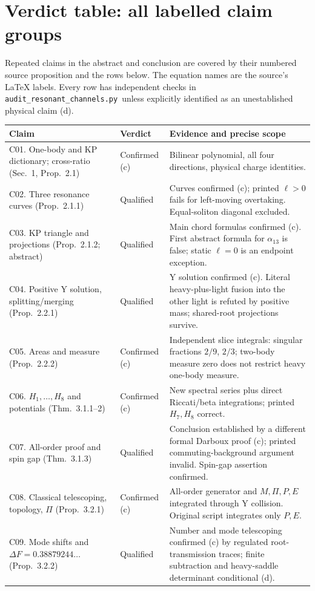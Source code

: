 \documentclass[11pt,a4paper]{article}
\newcommand{\scr}{\texttt{audit\_\allowbreak resonant\_\allowbreak channels.py}}
\begin{document}
\section{Verdict table: all labelled claim groups}
Repeated claims in the abstract and conclusion are covered by their numbered
source proposition and the rows below. The equation names are the source's
LaTeX labels. Every row has independent checks in \scr\ unless explicitly
identified as an unestablished physical claim (d).
\small
\begin{longtable}{@{}L{5.6cm}L{2.4cm}L{7.2cm}@{}}
\toprule Claim & Verdict & Evidence and precise scope\\\midrule\endhead
C01. One-body and KP dictionary; cross-ratio (Sec.~1, Prop.~2.1) & Confirmed (c) & Bilinear polynomial, all four directions, physical charge identities.\\
C02. Three resonance curves (Prop.~2.1.1) & Qualified & Curves confirmed (c); printed $\ell>0$ fails for left-moving overtaking. Equal-soliton diagonal excluded.\\
C03. KP triangle and projections (Prop.~2.1.2; abstract) & Qualified & Main chord formulas confirmed (c). First abstract formula for $\alpha_{13}$ is false; static $\ell=0$ is an endpoint exception.\\
C04. Positive Y solution, splitting/merging (Prop.~2.2.1) & Qualified & Y solution confirmed (c). Literal heavy-plus-light fusion into the other light is refuted by positive mass; shared-root projections survive.\\
C05. Areas and measure (Prop.~2.2.2) & Confirmed (c) & Independent slice integrals: singular fractions $2/9$, $2/3$; two-body measure zero does not restrict heavy one-body measure.\\
C06. $H_1,\ldots,H_8$ and potentials (Thm.~3.1.1--2) & Confirmed (c) & New spectral series plus direct Riccati/beta integrations; printed $H_7,H_8$ correct.\\
C07. All-order proof and spin gap (Thm.~3.1.3) & Qualified & Conclusion established by a different formal Darboux proof (c); printed commuting-background argument invalid. Spin-gap assertion confirmed.\\
C08. Classical telescoping, topology, $\Pi$ (Prop.~3.2.1) & Confirmed (c) & All-order generator and $M,\Pi,P,E$ integrated through Y collision. Original script integrates only $P,E$.\\
C09. Mode shifts and $\Delta F=0.38879244\ldots$ (Prop.~3.2.2) & Qualified & Number and mode telescoping confirmed (c) by regulated root-transmission traces; finite subtraction and heavy-saddle determinant conditional (d).\\

\end{longtable}
\end{document}
